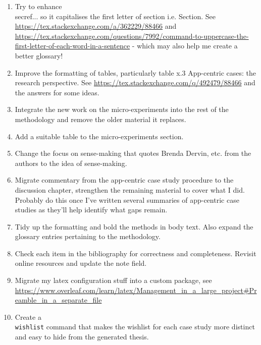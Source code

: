 \begin{enumerate}
    \item Try to enhance \\secref... so it capitalises the first letter of section i.e. Section. See \url{https://tex.stackexchange.com/a/362229/88466} and \url{https://tex.stackexchange.com/questions/7992/command-to-uppercase-the-first-letter-of-each-word-in-a-sentence} - which may also help me create a better glossary!
    
    \item Improve the formatting of tables, particularly table x.3 App-centric cases: the research perspective. See \url{https://tex.stackexchange.com/q/492479/88466} and the answers for some ideas.
    
    \item Integrate the new work on the micro-experiments into the rest of the methodology and remove the older material it replaces.
    
    \item Add a suitable table to the micro-experiments section.
    
    \item Change the focus on sense-making that quotes Brenda Dervin, etc. from the authors to the idea of sense-making.
    
    \item Migrate commentary from the app-centric case study procedure to the discussion chapter, strengthen the remaining material to cover what I did. Probably do this once I've written several summaries of app-centric case studies as they'll help identify what gaps remain.
    
    \item Tidy up the formatting and bold the methods in body text. Also expand the glossary entries pertaining to the methodology.
    
    \item Check each item in the bibliography for correctness and completeness. Revisit online resources and update the note field.
    
    \item Migrate my latex configuration stuff into a custom package, see \url{https://www.overleaf.com/learn/latex/Management_in_a_large_project#Preamble_in_a_separate_file}
    
    \item Create a \texttt{\\wishlist} command that makes the wishlist for each case study more distinct and easy to hide from the generated thesis.


\end{enumerate}
